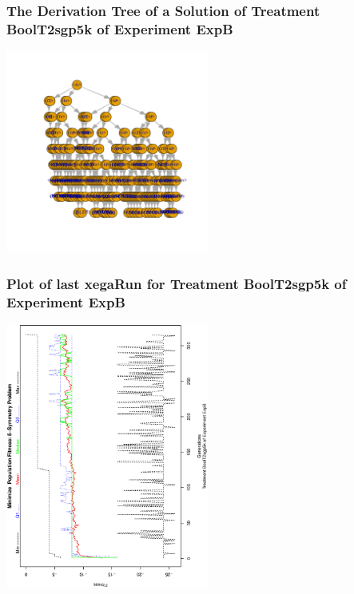 \documentclass[18pt,c]{beamer}
\begin{document}
 \begin{frame}
 \frametitle{ The Derivation Tree of a Solution of Treatment BoolT2sgp5k of Experiment ExpB }
 \begin{center}
\includegraphics[width=0.5\textwidth, angle=0]
{ExpBDerivationTreeFigure013.pdf}
 \end{center}
 \label{report/ExpBDerivationTreeFigure013.pdf}  
 \end{frame}

 \begin{frame}
 \frametitle{ Plot of last xegaRun for Treatment BoolT2sgp5k of Experiment ExpB }
 \begin{center}
\includegraphics[width=0.5\textwidth, angle=-90]
{ExpBPlotPopStatsFigure013.eps}
 \end{center}
 \label{report/ExpBPlotPopStatsFigure013.eps}  
 \end{frame}
\end{document}
